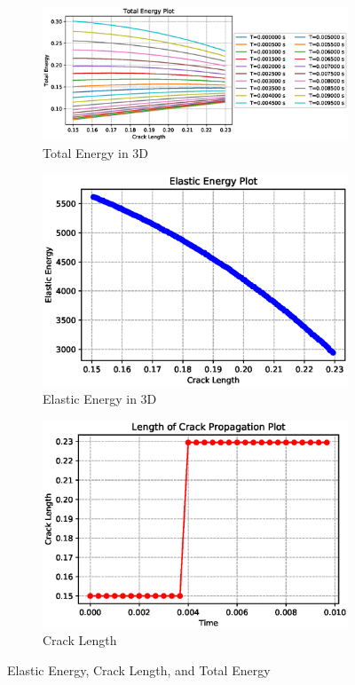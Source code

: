 \documentclass[a4paper,11pt]{article}
\begin{document}
\begin{figure}[h!]
	\begin{subfigure}[b]{\linewidth}
		\centering
		\includegraphics[width=\linewidth]{picture/conference/totalenergy3d}
		\caption{Total Energy in 3D}
		\label{fig:totalenergy3d}
	\end{subfigure}
	\quad
	\begin{subfigure}[b]{0.49\linewidth}
		\centering
		\includegraphics[width=\linewidth]{picture/conference/elastic3d}
		\caption{Elastic Energy in 3D}
		\label{fig:elastic3d}
	\end{subfigure}
	\quad
	\begin{subfigure}[b]{0.49\linewidth}
		\centering
		\includegraphics[width=\linewidth]{picture/conference/cracklength3d}
		\caption{Crack Length}
		\label{fig:cracklength3d}
	\end{subfigure}
	\caption{Elastic Energy, Crack Length, and Total Energy}
	\label{fig:crack3d}
\end{figure}
\newpage
\end{document}
